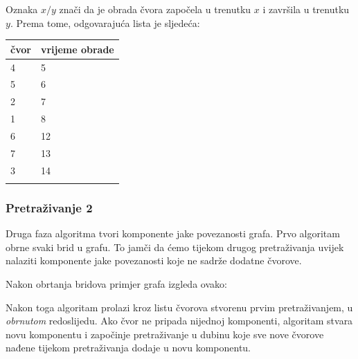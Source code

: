 Oznaka $x/y$ znači da je
obrada čvora započela
u trenutku $x$ i završila u trenutku $y$.
Prema tome, odgovarajuća lista je sljedeća:

\begin{tabular}{ll}
\\
čvor & vrijeme obrade \\
\hline
4 & 5 \\
5 & 6 \\
2 & 7 \\
1 & 8 \\
6 & 12 \\
7 & 13 \\
3 & 14 \\
\\
\end{tabular}
% 

\subsubsection{Pretraživanje 2}

Druga faza algoritma
tvori komponente jake povezanosti
grafa.
Prvo algoritam obrne svaki
brid u grafu.
To jamči da ćemo tijekom drugog pretraživanja
uvijek nalaziti komponente jake
povezanosti koje ne sadrže dodatne čvorove.

Nakon obrtanja bridova
primjer grafa izgleda ovako:
\begin{center}
\end{center}

Nakon toga algoritam prolazi kroz
listu čvorova stvorenu prvim pretraživanjem,
u \emph{obrnutom} redoslijedu.
Ako čvor ne pripada nijednoj komponenti,
algoritam stvara novu komponentu
i započinje pretraživanje u dubinu
koje sve nove čvorove nađene tijekom pretraživanja
dodaje u novu komponentu.

